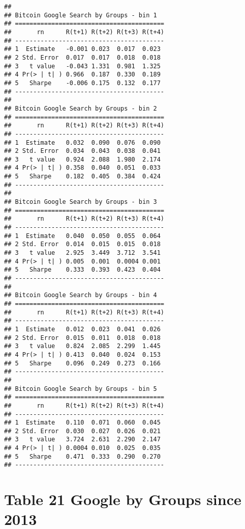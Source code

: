 \documentclass[
]{article}
\begin{document}
\begin{verbatim}
## 
## Bitcoin Google Search by Groups - bin 1
## =========================================
##       rn      R(t+1) R(t+2) R(t+3) R(t+4)
## -----------------------------------------
## 1  Estimate   -0.001 0.023  0.017  0.023 
## 2 Std. Error  0.017  0.017  0.018  0.018 
## 3   t value   -0.043 1.331  0.981  1.325 
## 4 Pr(> | t| ) 0.966  0.187  0.330  0.189 
## 5   Sharpe    -0.006 0.175  0.132  0.177 
## -----------------------------------------
## 
## Bitcoin Google Search by Groups - bin 2
## =========================================
##       rn      R(t+1) R(t+2) R(t+3) R(t+4)
## -----------------------------------------
## 1  Estimate   0.032  0.090  0.076  0.090 
## 2 Std. Error  0.034  0.043  0.038  0.041 
## 3   t value   0.924  2.088  1.980  2.174 
## 4 Pr(> | t| ) 0.358  0.040  0.051  0.033 
## 5   Sharpe    0.182  0.405  0.384  0.424 
## -----------------------------------------
## 
## Bitcoin Google Search by Groups - bin 3
## =========================================
##       rn      R(t+1) R(t+2) R(t+3) R(t+4)
## -----------------------------------------
## 1  Estimate   0.040  0.050  0.055  0.064 
## 2 Std. Error  0.014  0.015  0.015  0.018 
## 3   t value   2.925  3.449  3.712  3.541 
## 4 Pr(> | t| ) 0.005  0.001  0.0004 0.001 
## 5   Sharpe    0.333  0.393  0.423  0.404 
## -----------------------------------------
## 
## Bitcoin Google Search by Groups - bin 4
## =========================================
##       rn      R(t+1) R(t+2) R(t+3) R(t+4)
## -----------------------------------------
## 1  Estimate   0.012  0.023  0.041  0.026 
## 2 Std. Error  0.015  0.011  0.018  0.018 
## 3   t value   0.824  2.085  2.299  1.445 
## 4 Pr(> | t| ) 0.413  0.040  0.024  0.153 
## 5   Sharpe    0.096  0.249  0.273  0.166 
## -----------------------------------------
## 
## Bitcoin Google Search by Groups - bin 5
## =========================================
##       rn      R(t+1) R(t+2) R(t+3) R(t+4)
## -----------------------------------------
## 1  Estimate   0.110  0.071  0.060  0.045 
## 2 Std. Error  0.030  0.027  0.026  0.021 
## 3   t value   3.724  2.631  2.290  2.147 
## 4 Pr(> | t| ) 0.0004 0.010  0.025  0.035 
## 5   Sharpe    0.471  0.333  0.290  0.270 
## -----------------------------------------
\end{verbatim}

\hypertarget{table-21-google-by-groups-since-2013}{%
\section{Table 21 Google by Groups since
2013}\label{table-21-google-by-groups-since-2013}}
\end{document}
